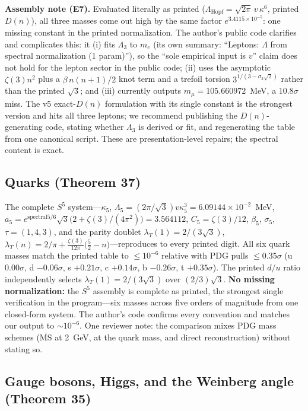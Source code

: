 \documentclass[11pt,letterpaper]{article}
\newcommand{\Sp}[1]{S^{#1}}
\begin{document}
\textbf{Assembly note (E7).} Evaluated literally as printed
($\Lambda_{\mathrm{Hopf}}=\sqrt{2\pi}\,v\,\kappa^6$, printed $D(n)$), all
three masses come out high by the same factor $e^{3.4115\times10^{-5}}$: one
missing constant in the printed normalization. The author's public code
clarifies and complicates this: it (i) fits $\Lambda_3$ to $m_e$ (its own
summary: ``Leptons: $\Lambda$ from spectral normalization (1 param)''), so
the ``sole empirical input is $v$'' claim does not hold for the lepton sector
in the public code; (ii) uses the asymptotic $\zeta(3)n^2$ plus a
$\beta\,n(n+1)/2$ knot term and a trefoil torsion $3^{1/(3-\sigma_3\sqrt2)}$
rather than the printed $\sqrt3$; and (iii) currently outputs
$m_\mu=105.660972$~MeV, a $10.8\sigma$ miss. The v5 exact-$D(n)$ formulation
with its single constant is the strongest version and hits all three leptons;
we recommend publishing the $D(n)$-generating code, stating whether
$\Lambda_3$ is derived or fit, and regenerating the table from one canonical
script. These are presentation-level repairs; the spectral content is exact.

\subsection{Quarks (Theorem 37)}
\label{sec:quarks}

The complete $\Sp{5}$ system---$\kappa_5$,
$\Lambda_5=(2\pi/\sqrt3)v\kappa_5^3=6.09144\times10^{-2}$~MeV,
$a_5=e^{\mathrm{spectral5}/6}\sqrt3\bigl(2+\zeta(3)/(4\pi^2)\bigr)=3.564112$,
$C_5=\zeta(3)/12$, $\beta_5$, $\sigma_5$, $\tau=(1,4,3)$, and the parity
doublet $\lambda_T(1)=2/(3\sqrt3)$, $\lambda_T(n)=2/\pi+
\frac{\zeta(3)}{12\pi}\bigl(\tfrac52-n\bigr)$---reproduces to every printed
digit. All six quark masses match the printed table to $\le10^{-6}$ relative
with PDG pulls $\le0.35\sigma$ (u $0.00\sigma$, d $-0.06\sigma$, s
$+0.21\sigma$, c $+0.14\sigma$, b $-0.26\sigma$, t $+0.35\sigma$). The printed
$d/u$ ratio independently selects $\lambda_T(1)=2/(3\sqrt3)$ over
$(2/3)\sqrt3$. \textbf{No missing normalization:} the $\Sp{5}$ assembly is
complete as printed, the strongest single verification in the program---six
masses across five orders of magnitude from one closed-form system. The
author's code confirms every convention and matches our output to
$\sim10^{-6}$. One reviewer note: the comparison mixes PDG mass schemes
($\overline{\mathrm{MS}}$ at 2~GeV, at the quark mass, and direct
reconstruction) without stating so.

\subsection{Gauge bosons, Higgs, and the Weinberg angle (Theorem 35)}
\label{sec:bosons}
\end{document}
